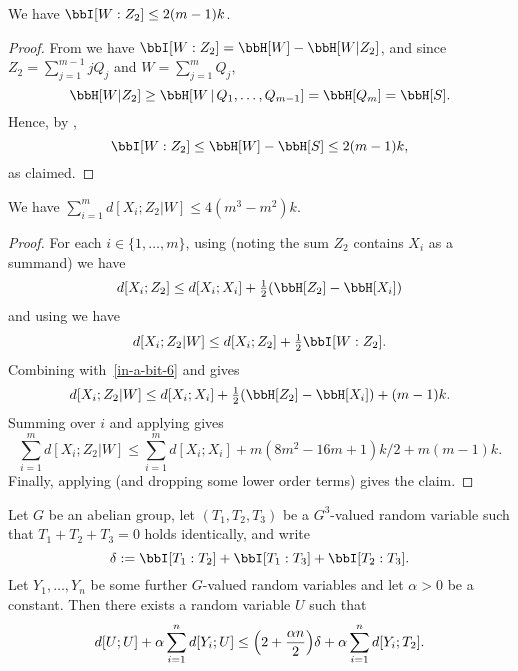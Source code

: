 \begin{lemma}\label{mutual-w-z2}\leanok  We have  $\bbI[W : Z_2] \leq 2 (m-1) k$.
\end{lemma}

\begin{proof}\leanok
  From  we have $\bbI[W : Z_2] = \bbH[W] - \bbH[W | Z_2]$, and since $Z_2 = \sum_{j=1}^{m-1} j Q_j$ and $W = \sum_{j=1}^m Q_j$,
  \[
    \bbH[W | Z_2] \geq \bbH[W \,|\, Q_1,\dots,Q_{m-1}] = \bbH[Q_m] = \bbH[S].
  \]
  Hence, by ,
  \[
    \bbI[W : Z_2] \leq \bbH[W] - \bbH[S] \leq 2 (m-1) k,
  \]
  as claimed.
\end{proof}

\begin{lemma}\label{xi-z2-w-dist}\leanok We have $\sum_{i=1}^m d[X_i;Z_2|W] \leq 4(m^3-m^2) k$.
\end{lemma}

\begin{proof}\leanok
  For each $i \in \{1,\dots, m\}$, using  (noting the sum $Z_2$ contains $X_i$ as a summand) we have
  \begin{equation}\label{in-a-bit-6}
    d[X_i;Z_2] \leq d[X_i;X_i] + \tfrac12 (\bbH[Z_2] - \bbH[X_i])
  \end{equation}
  and using  we have
  \[
    d[X_i;Z_2 | W] \leq d[X_i;Z_2] + \tfrac12 \bbI[W : Z_2].
  \]
 Combining with~\eqref{in-a-bit-6} and  gives
 \[ d[X_i;Z_2 | W] \leq d[X_i;X_i] + \tfrac12 (\bbH[Z_2] - \bbH[X_i]) + (m-1)k.\]
 Summing over $i$ and applying  gives
 \[ \sum_{i = 1}^m d[X_i;Z_2 | W] \leq \sum_{i = 1}^m d[X_i;X_i] + m(8m^2-16m+1) k/2 + m(m-1) k.\]
Finally, applying  (and dropping some lower order terms) gives the claim.
\end{proof}

\begin{lemma}
  \label{lem:get-better}\leanok
  Let $G$ be an abelian group, let $(T_1,T_2,T_3)$ be a $G^3$-valued random variable such that $T_1+T_2+T_3=0$ holds identically, and write
  \[
    \delta := \bbI[T_1 : T_2] + \bbI[T_1 : T_3] + \bbI[T_2 : T_3].
  \]
  Let $Y_1,\dots,Y_n$ be some further $G$-valued random variables and let $\alpha>0$ be a constant.
  Then there exists a random variable $U$ such that
  \begin{equation}
    \label{eq:get-better}
    d[U;U] + \alpha \sum_{i=1}^n d[Y_i;U] \leq \Bigl(2 + \frac{\alpha n}{2} \Bigr) \delta + \alpha \sum_{i=1}^n d[Y_i;T_2].
  \end{equation}
\end{lemma}

